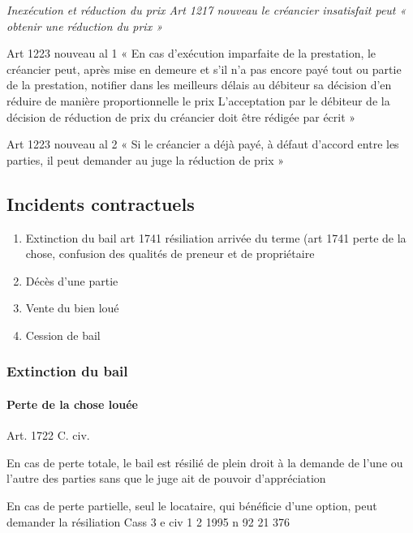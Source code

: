 \documentclass[10pt,a4paper,twoside]{article}
\newenvironment*{focus}[1][]{\medskip \textbf{#1} \newline \itshape}{}
\begin{document}
			\begin{focus}{Inexécution et réduction du prix}
				Art 1217 nouveau le créancier insatisfait peut « obtenir une réduction du prix »

				Art 1223 nouveau al 1 « En cas d'exécution imparfaite de la prestation, le créancier peut, après mise en demeure et s'il n'a pas encore payé tout ou partie de la prestation, notifier dans les meilleurs délais au débiteur sa décision d'en réduire de manière proportionnelle le prix
				 L'acceptation par le débiteur de la décision de réduction de prix du créancier doit être rédigée par écrit »

				Art 1223 nouveau al 2 « Si le créancier a déjà payé, à défaut d'accord
				entre les parties, il peut demander au juge la réduction de prix »
			\end{focus}


	\subsection{Incidents contractuels}

		\begin{enumerate}
			\item Extinction du bail art 1741 résiliation arrivée du
				terme (art 1741 perte de la chose, confusion des
				qualités de preneur et de propriétaire

			\item Décès d’une partie

			\item Vente du bien loué

			\item Cession de bail
		\end{enumerate}

		\subsubsection{Extinction du bail}

			\paragraph{Perte de la chose louée}

				Art. 1722 C. civ.

				En cas de perte totale, le bail est résilié de plein droit à
				la demande de l’une ou l’autre des parties sans que le
				juge ait de pouvoir d’appréciation

				En cas de perte partielle, seul le locataire, qui bénéficie
				d’une option, peut demander la résiliation Cass 3 e civ
				1 2 1995 n 92 21 376
\end{document}
